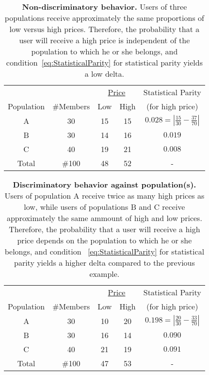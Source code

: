\begin{table}[h]
{\scriptsize
  \renewcommand{\arraystretch}{1.5}
  \begin{tabular}{ c | c | c  c | c }
    & & \multicolumn{2}{|c|}{\underline{Price}} &  Statistical Parity\\
    Population & \#Members & Low & High & (for high price) \\
    \hline
    A & 30 &  15 & 15 & $0.028 = | \frac{15}{30} - \frac{37}{70}|$ \\
    B & 30 &  14 & 16 & $0.019$ \\
    C & 40 &  19 & 21 & $0.008$ \\
    \hline
    Total & \#100 & 48 & 52 & - \\
  \end{tabular}
  \caption{{\bf Non-discriminatory behavior.} Users of three populations receive approximately
  the same proportions of low versus high prices. Therefore, the probability that a user
  will receive a high price is independent of the population to which he or she belongs,
  and condition~\ref{eq:StatisticalParity} for statistical parity yields a low delta.}
  \label{tab:NondiscriminationExample}
} \end{table}

\begin{table}[h]
{\scriptsize
  \renewcommand{\arraystretch}{1.5}
  \begin{tabular}{ c | c | c  c | c }
    & & \multicolumn{2}{|c|}{\underline{Price}} &  Statistical Parity\\
    Population & \#Members & Low & High & (for high price) \\
    \hline
    A & 30 &  10 & 20 & $0.198 = | \frac{20}{30} - \frac{33}{70}|$ \\
    B & 30 &  16 & 14 & $0.090$ \\
    C & 40 &  21 & 19 & $0.091$ \\
    \hline
    Total & \#100 & 47 & 53 & - \\
  \end{tabular}
  \caption{{\bf Discriminatory behavior against population(s).} Users of population A receive twice
  as many high prices as low, while users of populations B and C receive approximately the same
  ammount of high and low prices. Therefore, the probability that a user will receive a high price
  depends on the population to which he or she belongs, and condition ~\ref{eq:StatisticalParity}
  for statistical parity yields a higher delta compared to the previous example. }
  \label{tab:DiscrimniationExample}
} \end{table}

